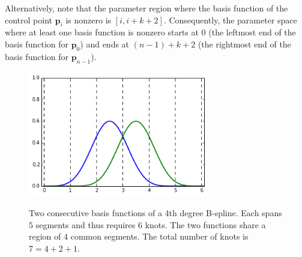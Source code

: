 \documentclass{article}
\newcommand{\bp}{\mathbf{p}}
\begin{document}
\begin{enumerate}
Alternatively, note that the parameter region where the basis function of the control point $\bp_i$ is nonzero is $[i, i+k+2]$. Consequently, the parameter space where at least one basis function is nonzero starts at $0$ (the leftmost end of the basis function for $\bp_0$) and ends at $(n-1)+k+2$ (the rightmost end of the basis function for $\bp_{n-1}$).

\begin{figure}[h]
\centering
\includegraphics[width=0.7\textwidth]{knotcount.png}
\begin{minipage}{0.9\textwidth}
Two consecutive basis functions of a 4th degree B-spline. Each spans $5$ segments and thus requires $6$ knots. The two functions share a region of $4$ common segments. The total number of knots is $7=4+2+1$.
\end{minipage}
\end{figure}
\end{enumerate}
\end{document}

